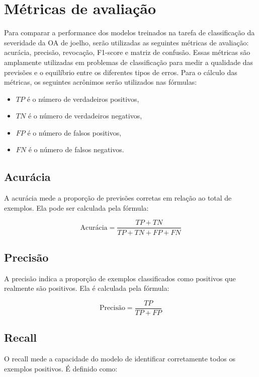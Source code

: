 \section{Métricas de avaliação}

Para comparar a performance dos modelos treinados na tarefa de classificação da severidade da OA de joelho, serão utilizadas as seguintes métricas de avaliação: acurácia, precisão, revocação, F1-score e matriz de confusão. Essas métricas são amplamente utilizadas em problemas de classificação para medir a qualidade das previsões e o equilíbrio entre os diferentes tipos de erros. Para o cálculo das métricas, os seguintes acrônimos serão utilizados nas fórmulas:

\begin{itemize}
    \item $TP$ é o número de verdadeiros positivos,
    \item $TN$ é o número de verdadeiros negativos,
    \item $FP$ é o número de falsos positivos,
    \item $FN$ é o número de falsos negativos.
\end{itemize}

\subsection{Acurácia}
A acurácia mede a proporção de previsões corretas em relação ao total de exemplos. Ela pode ser calculada pela fórmula:

\begin{equation}
    \text{Acurácia} = \frac{TP + TN}{TP + TN + FP + FN}
\end{equation}

\subsection{Precisão}
A precisão indica a proporção de exemplos classificados como positivos que realmente são positivos. Ela é calculada pela fórmula:

\begin{equation}
    \text{Precisão} = \frac{TP}{TP + FP}
\end{equation}

\subsection{Recall}
O recall mede a capacidade do modelo de identificar corretamente todos os exemplos positivos. É definido como:

